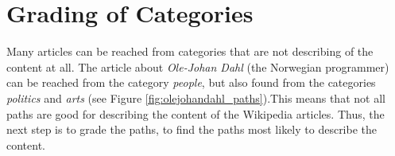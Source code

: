 \section{Grading of Categories}

\begin{comment}
The structure of Wikipedia could be considered confusing since anyone can edit. This means that the underlying category structure of Wikipedia contains lots of links between all categories. 

This means that it is possible to reach almost all articles from each category. 

This means that there are categories that reach lots of other categories. These should not be considered as important as the other categories. A program was made to find these categories. 

There are 28 top categories (direct subcategories of %

The main assumption is that if a category leads to many of the top categories, it is possible to reach lots of articles which are not associated with the category. 

Eksempel på hvordan kategorier finner artikler som ikke har noen sammenheng med kategorien.

If a category leads to many of these 
The top categories (28) leads to lots of subcategories. 

Another way of finding categories that does not provide information about the path, is to find all categories with many parent categories and with many subcategories since this means that they easily can reach categories not relevant for the category. 

Hence a program was made to find the number of parent categories and subcategories for each category. 
\end{comment}

Many articles can be reached from categories that are not describing of the content at all. The article about \emph{Ole-Johan Dahl} (the Norwegian programmer) can be reached from the category \emph{people}, but also found from the categories \emph{politics} and \emph{arts} (see Figure \ref{fig:olejohandahl_paths}).This means that not all paths are good for describing the content of the Wikipedia articles. Thus, the next step is to grade the paths, to find the paths most likely to describe the content.

